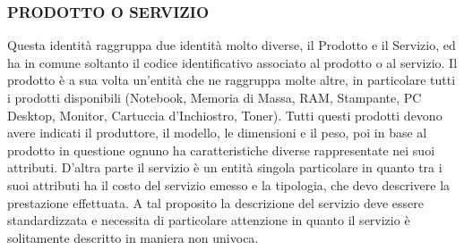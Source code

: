\subsubsection{PRODOTTO O SERVIZIO}
Questa identità raggruppa due identità molto diverse, il Prodotto e il Servizio, ed ha in comune soltanto il codice identificativo associato al prodotto o al servizio.\newline
Il prodotto è a sua volta un'entità che ne raggruppa molte altre, in particolare tutti i prodotti disponibili (Notebook, Memoria di Massa, RAM, Stampante, PC Desktop, Monitor, Cartuccia d'Inchiostro, Toner). Tutti questi prodotti devono avere indicati il produttore, il modello, le dimensioni e il peso, poi in base al prodotto in questione ognuno ha caratteristiche diverse rappresentate nei suoi attributi.\newline
D'altra parte il servizio è un entità singola particolare in quanto tra i suoi attributi ha il costo del servizio emesso e la tipologia, che devo descrivere la prestazione effettuata. A tal proposito la descrizione del servizio deve essere standardizzata e necessita di particolare attenzione in quanto il servizio è solitamente descritto in maniera non univoca. \newline\newline
\noindent{}

